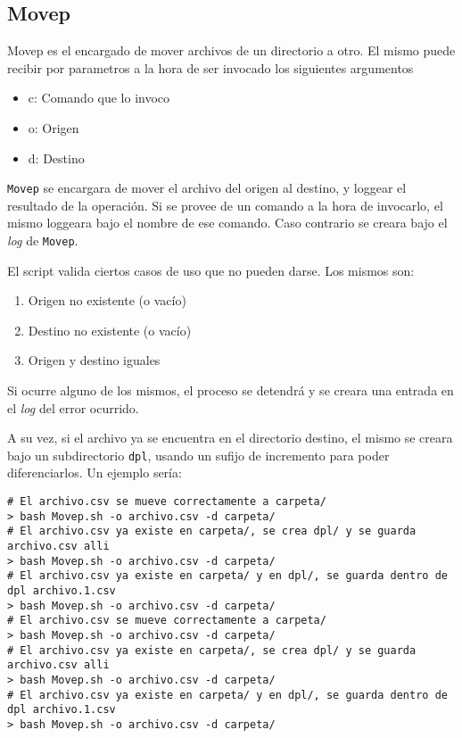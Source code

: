 \documentclass[10pt,a4paper]{article}
\begin{document}
\subsection{Movep}

Movep es el encargado de mover archivos de un directorio a otro. El mismo puede recibir por parametros a la hora de ser invocado los siguientes argumentos

\begin{itemize}
    \item c: Comando que lo invoco
    
    \item o: Origen
    
    \item d: Destino
\end{itemize}

\texttt{Movep} se encargara de mover el archivo del origen al destino, y loggear el resultado de la operación. Si se provee de un comando a la hora de invocarlo, el mismo loggeara bajo el nombre de ese comando. Caso contrario se creara bajo el \textit{log} de \texttt{Movep}.

El script valida ciertos casos de uso que no pueden darse. Los mismos son:

\begin{enumerate}
    \item Origen no existente (o vacío)
    
    \item Destino no existente (o vacío)
    
    \item Origen y destino iguales
\end{enumerate}

Si ocurre alguno de los mismos, el proceso se detendrá y se creara una entrada en el \textit{log} del error ocurrido.

A su vez, si el archivo ya se encuentra en el directorio destino, el mismo se creara bajo un subdirectorio \texttt{dpl}, usando un sufijo de incremento para poder diferenciarlos. Un ejemplo sería:


\begin{lstlisting}
# El archivo.csv se mueve correctamente a carpeta/
> bash Movep.sh -o archivo.csv -d carpeta/
# El archivo.csv ya existe en carpeta/, se crea dpl/ y se guarda archivo.csv alli
> bash Movep.sh -o archivo.csv -d carpeta/
# El archivo.csv ya existe en carpeta/ y en dpl/, se guarda dentro de 
dpl archivo.1.csv
> bash Movep.sh -o archivo.csv -d carpeta/
# El archivo.csv se mueve correctamente a carpeta/
> bash Movep.sh -o archivo.csv -d carpeta/
# El archivo.csv ya existe en carpeta/, se crea dpl/ y se guarda archivo.csv alli
> bash Movep.sh -o archivo.csv -d carpeta/
# El archivo.csv ya existe en carpeta/ y en dpl/, se guarda dentro de dpl archivo.1.csv
> bash Movep.sh -o archivo.csv -d carpeta/
\end{lstlisting}
\end{document}
